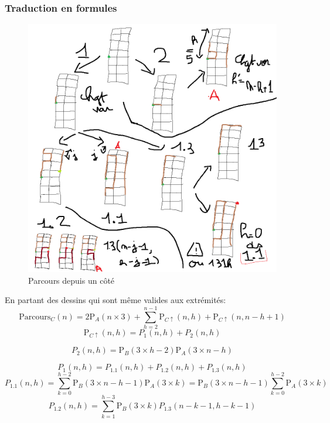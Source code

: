 \documentclass[twoside, a4paper, 12pt]{report}
\newcommand{\pa}[2]{\ensuremath{\text{P}_A\left(#1 \times #2\right)}}
\newcommand{\pb}[2]{\ensuremath{\text{P}_B\left(#1 \times #2\right)}}
\newcommand{\Pc}[1]{\ensuremath{\text{P}_{C\uparrow}(#1)}}
\newcommand{\Pctot}[1]{\ensuremath{\text{Parcours}_C(#1)}}
\begin{document}
\subsubsection{Traduction en formules}
\begin{figure}[h]
\centering\includegraphics[angle=0, scale=0.4]{roadmap_cote.png}
\caption{Parcours depuis un côté}
\label{parcour_cote}
\end{figure}
En partant des dessins qui sont même valides aux extrémités:
$$\Pctot{n} = 2 \pa{n}{3} + \sum_{h=2}^{n-1} \Pc{n, h} + \Pc{n, n-h+1}$$
$$\Pc{n, h} = P_1(n, h) + P_2(n, h) $$

$$P_{2}(n, h) = \pb{3}{h-2} \pa{3}{n-h}$$

$$P_1(n, h) = P_{1.1}(n, h) +  P_{1.2}(n, h) + P_{1.3}(n, h)$$
$$P_{1.1} (n, h)= \sum_{k=0}^{h-2} \pb{3}{n - h - 1} \pa{3}{k} =  \pb{3}{n - h - 1} \sum_{k=0}^{h-2}\pa{3}{k}$$
$$P_{1.2}(n, h) = \sum_{k=1}^{h-3}  \pb{3}{k} P_{1.3} (n - k - 1, h- k -1)$$
\end{document}
